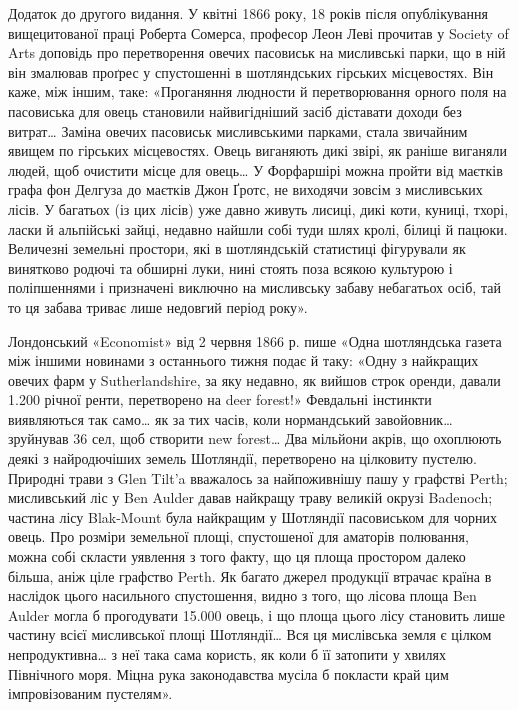 {Додаток до другого видання. У квітні 1866 року, 18 років після
опублікування вищецитованої праці Роберта Сомерса, професор Леон
Леві прочитав у Society of Arts доповідь про перетворення овечих пасовиськ
на мисливські парки, що в ній він змалював проґрес у спустошенні
в шотляндських гірських місцевостях. Він каже, між іншим, таке: «Проганяння
людности й перетворювання орного поля на пасовиська для
овець становили найвигідніший засіб діставати доходи без витрат\dots{} Заміна
овечих пасовиськ мисливськими парками, стала звичайним явищем
по гірських місцевостях. Овець виганяють дикі звірі, як раніше виганяли
людей, щоб очистити місце для овець\dots{} У Форфаршірі можна пройти
від маєтків графа фон Делгуза до маєтків Джон Ґротс, не виходячи
зовсім з мисливських лісів. У багатьох (із цих лісів) уже давно живуть
лисиці, дикі коти, куниці, тхорі, ласки й альпійські зайці, недавно
найшли собі туди шлях кролі, білиці й пацюки. Величезні земельні простори,
які в шотляндській статистиці фігурували як винятково родючі
та обширні луки, нині стоять поза всякою культурою і поліпшеннями і
призначені виключно на мисливську забаву небагатьох осіб, тай то ця
забава триває лише недовгий період року».

Лондонський «Economist» від 2 червня 1866 р. пише «Одна шотляндська
газета між іншими новинами з останнього тижня подає й таку:
«Одну з найкращих овечих фарм у Sutherlandshire, за яку недавно, як
вийшов строк оренди, давали 1.200 річної ренти, перетворено
на deer forest!» Февдальні інстинкти виявляються так само\dots{}
як за тих часів, коли нормандський завойовник\dots{} зруйнував 36 сел, щоб
створити new forest\dots{} Два мільйони акрів, що охоплюють деякі з найродючіших
земель Шотляндії, перетворено на цілковиту пустелю. Природні
трави з Glen Tilt’a вважалось за найпоживнішу пашу у графстві Perth;
мисливський ліс у Ben Aulder давав найкращу траву великій окрузі
Badenoch; частина лісу Blak-Mount була найкращим у Шотляндії пасовиськом
для чорних овець. Про розміри земельної площі, спустошеної
для аматорів полювання, можна собі скласти уявлення з того факту, що
ця площа простором далеко більша, аніж ціле графство Perth. Як багато
джерел продукції втрачає країна в наслідок цього насильного спустошення,
видно з того, що лісова площа Ben Aulder могла б прогодувати
15.000 овець, і що площа цього лісу становить лише  частину всієї
мисливської площі Шотляндії\dots{} Вся ця мислівська земля є цілком непродуктивна\dots{}
з неї така сама користь, як коли б її затопити у хвилях
Північного моря. Міцна рука законодавства мусіла б покласти край цим
імпровізованим пустелям».
}

